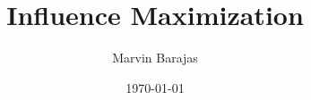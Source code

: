 \documentclass{article}
\title{Influence Maximization}
\author{Marvin Barajas}
\date{\today}			%
\begin{document}
\maketitle			%

\cite{9695654}			%
\cite{9188557}
\cite{9045797}

	
\begin{thebibliography}{}
\end{thebibliography}
\end{document}
